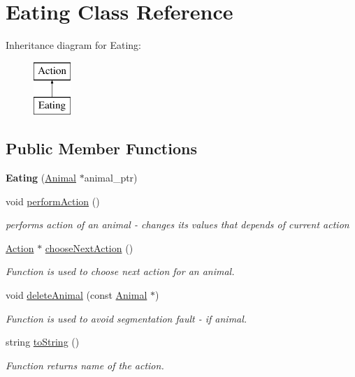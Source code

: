 \hypertarget{class_eating}{}\section{Eating Class Reference}
\label{class_eating}
Inheritance diagram for Eating\+:\begin{figure}[H]
\begin{center}
\leavevmode
\includegraphics[height=2.000000cm]{class_eating}
\end{center}
\end{figure}
\subsection*{Public Member Functions}
\begin{DoxyCompactItemize}
\item 
\hypertarget{class_eating_a501ef632ad57bffad92d868530d77bd6}{}{\bfseries Eating} (\hyperlink{class_animal}{Animal} $\ast$animal\+\_\+ptr)\label{class_eating_a501ef632ad57bffad92d868530d77bd6}

\item 
void \hyperlink{class_eating_a0157edfea4cde8e596313d99c4b235be}{perform\+Action} ()
\begin{DoxyCompactList}\small\item\em performs action of an animal -\/ changes it\textquotesingle{}s values that depends of current action \end{DoxyCompactList}\item 
\hyperlink{class_action}{Action} $\ast$ \hyperlink{class_eating_aacfac2762df1da29e4555071e8720390}{choose\+Next\+Action} ()
\begin{DoxyCompactList}\small\item\em Function is used to choose next action for an animal. \end{DoxyCompactList}\item 
void \hyperlink{class_eating_a85cc0b93f26839dbf8c1344ce92c9e41}{delete\+Animal} (const \hyperlink{class_animal}{Animal} $\ast$)
\begin{DoxyCompactList}\small\item\em Function is used to avoid segmentation fault -\/ if animal. \end{DoxyCompactList}\item 
string \hyperlink{class_eating_a78e402536e59efec5e4643ffe0b4fd5a}{to\+String} ()
\begin{DoxyCompactList}\small\item\em Function returns name of the action. \end{DoxyCompactList}\end{DoxyCompactItemize}

